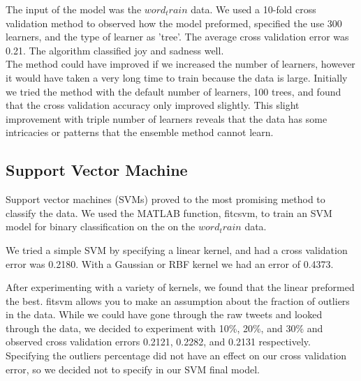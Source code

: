 \documentclass[]{article}
\begin{document}
The input of the model was the $word_train$ data. We used a 10-fold cross validation method to observed how the model preformed, specified the use 300 learners, and the type of learner as 'tree'. The average cross validation error was 0.21. The algorithm classified joy and sadness well. \\

The method could have improved if we increased the number of learners, however it would have taken a very long time to train because the data is large. Initially we tried the method with the default number of learners, 100 trees, and found that the cross validation accuracy only improved slightly. This slight improvement with triple number of learners reveals that the data has some intricacies or patterns that the ensemble method cannot learn.   


\subsection{Support Vector Machine}

Support vector machines (SVMs) proved to the most promising method to classify the data. We used the MATLAB function, fitcsvm, to train an SVM model for binary classification on the on the $word_train$ data.

We tried a simple SVM by specifying a linear kernel, and had a  cross validation error was 0.2180. With a Gaussian or RBF kernel we had an error of 0.4373. 


After experimenting with a variety of kernels, we found that the linear preformed the best. fitsvm allows you to make an assumption about the fraction of outliers in the data. While we could have gone through the raw tweets and looked through the data, we decided to experiment with  10\%, 20\%, and 30\% and observed cross validation errors 0.2121, 0.2282, and 0.2131 respectively. Specifying the outliers percentage did not have an effect on our cross validation error, so we decided not to specify in our SVM final model. 
\end{document}
